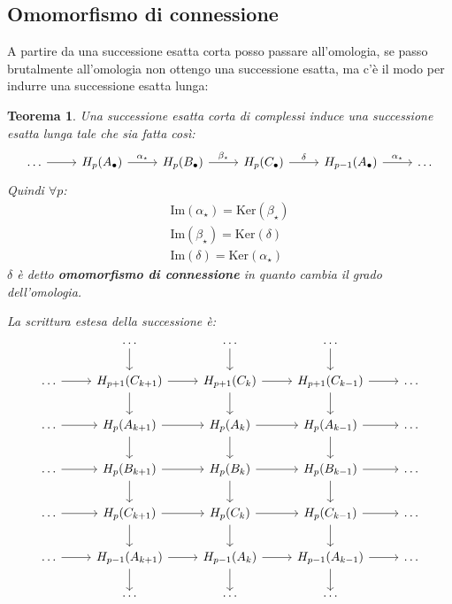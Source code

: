 \documentclass[10pt, twoside=false, x11names]{scrbook}
\newtheorem{theorem}{Teorema}[section]
\newcommand{\im}[1]{\mathrm{Im}( #1 )}
\renewcommand{\ker}[1]{\mathrm{Ker}( #1)}
\begin{document}
\subsection{Omomorfismo di connessione}
A partire da una successione esatta corta
posso passare all'omologia, se passo brutalmente
all'omologia non ottengo una successione esatta,
ma c'è il modo per indurre una successione esatta lunga:
\begin{theorem}
  Una successione esatta corta di complessi induce una successione
  esatta lunga tale che sia fatta così:
  \[
    \begin{tikzcd}
      \dots \arrow{r}{} & H_p(A_\bullet) \arrow{r}{\alpha_\star} & H_p(B_\bullet) \arrow{r}{\beta_\star} & H_p(C_\bullet) \arrow{r}{\delta}
      & H_{p-1}(A_\bullet) \arrow{r}{\alpha_\star} & \dots
    \end{tikzcd}
  \]
  Quindi $ \forall p $:
  \begin{gather*}
    \im{\alpha_\star} = \ker{\beta_\star} \\
    \im{\beta_\star} = \ker{\delta} \\
    \im{\delta} = \ker{\alpha_\star}
  \end{gather*}
  $ \delta $ è detto \textbf{omomorfismo di connessione}
  in quanto cambia il grado dell'omologia.

  La scrittura estesa della successione è:
\[
  \begin{tikzcd}
    {} & \dots  \arrow{d}{} &  \dots  \arrow{d}{}  &  \dots  \arrow{d}{}  & {} \\
    \dots \arrow{r}{} & H_{p+1}(C_{k+1}) \arrow{r}{} \arrow{d}{} &  H_{p+1}(C_{k}) \arrow{r}{} \arrow{d}{} &  H_{p+1}(C_{k-1}) \arrow{r}{} \arrow{d}{} & \dots \\
    \dots \arrow{r}{} & H_p(A_{k+1}) \arrow{r}{} \arrow{d}{} & H_p(A_{k})  \arrow{r}{} \arrow{d}{} & H_p(A_{k-1})  \arrow{r}{} \arrow{d}{} & \dots \\
    \dots \arrow{r}{} & H_p(B_{k+1}) \arrow{r}{} \arrow{d}{} & H_p(B_{k})  \arrow{r}{} \arrow{d}{} & H_p(B_{k-1})  \arrow{r}{} \arrow{d}{} & \dots \\
    \dots \arrow{r}{} & H_p(C_{k+1}) \arrow{r}{} \arrow{d}{} & H_p(C_{k})  \arrow{r}{} \arrow{d}{} & H_p(C_{k-1})  \arrow{r}{} \arrow{d}{} & \dots \\
    \dots \arrow{r}{} & H_{p-1}(A_{k+1}) \arrow{r}{} \arrow{d}{}  &  H_{p-1}(A_{k}) \arrow{r}{} \arrow{d}{} &  H_{p-1}(A_{k-1}) \arrow{r}{} \arrow{d}{} & \dots \\
    {} & \dots &  \dots &  \dots & {}
  \end{tikzcd}
\]
\end{theorem}
\end{document}
